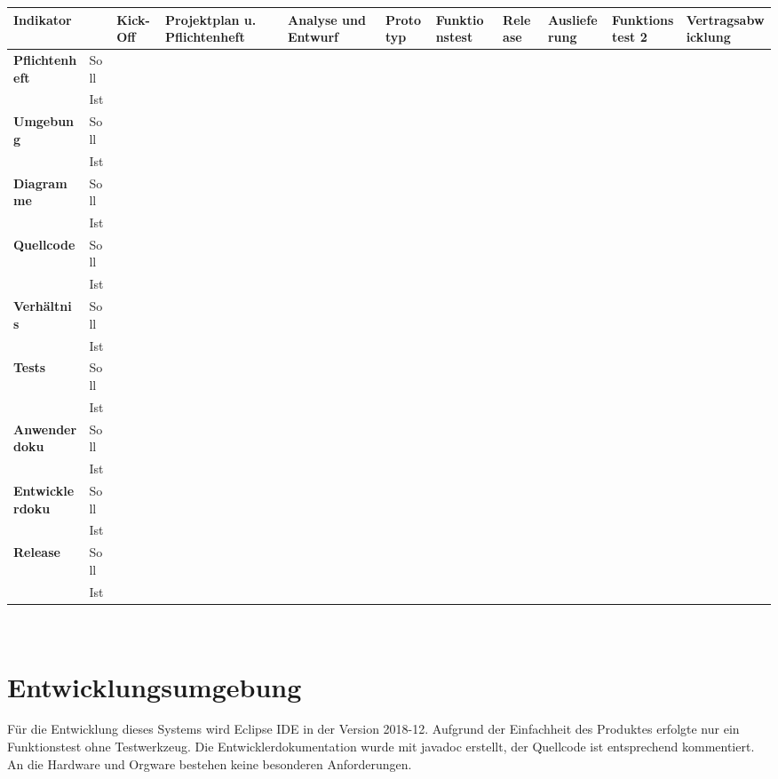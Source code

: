 \documentclass[12pt]{article}
\begin{document}
\begin{footnotesize}

\begin{tabularx}{\textwidth}{|p{19mm}|p{5mm}|p{8mm}|X|X|X|X|X|X|X|X|} \hline
\textbf{Indikator}& &\textbf{Kick-Off}&\textbf{Projekt\-plan u. Pflichtenheft}&\textbf{Analyse und Entwurf}&\textbf{Proto\-typ}&\textbf{Funk\-tions\-test}&\textbf{Release}&\textbf{Auslie\-ferung}& \textbf{Funk\-tions\-test 2}&\textbf{Ver\-trags\-abwick\-lung}\\ \hline
\textbf{Pflichten\-heft}	&Soll&&&&&&&&&\\ \hline &Ist&&&&&&&&&\\ \hline
\textbf{Umgebung}		&Soll&&&&&&&&&\\ \hline &Ist&&&&&&&&&\\ \hline
\textbf{Diagramme}		&Soll&&&&&&&&&\\ \hline &Ist&&&&&&&&&\\ \hline
\textbf{Quellcode}		&Soll&&&&&&&&&\\ \hline &Ist&&&&&&&&&\\ \hline
\textbf{Verhältnis}		&Soll&&&&&&&&&\\ \hline &Ist&&&&&&&&&\\ \hline
\textbf{Tests}			&Soll&&&&&&&&&\\ \hline &Ist&&&&&&&&&\\ \hline
\textbf{Anwender\-doku}	&Soll&&&&&&&&&\\ \hline &Ist&&&&&&&&&\\ \hline
\textbf{Entwickler\-doku}	&Soll&&&&&&&&&\\ \hline &Ist&&&&&&&&&\\ \hline
\textbf{Release}		&Soll&&&&&&&&&\\ \hline &Ist&&&&&&&&&\\ \hline
\end{tabularx}\\

\end{footnotesize}

\restoregeometry

\newpage

\section{Entwicklungsumgebung}
Für die Entwicklung dieses Systems wird Eclipse IDE in der Version 2018-12. Aufgrund der Einfachheit des Produktes erfolgte nur ein Funktionstest ohne Testwerkzeug. Die Entwicklerdokumentation wurde mit javadoc erstellt, der Quellcode ist entsprechend kommentiert. An die Hardware und Orgware bestehen keine besonderen Anforderungen.

\newpage
\clearpage
\printglossaries
\end{document}
